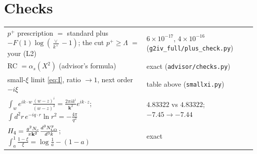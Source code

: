 \documentclass[10pt]{article}
\numberwithin{equation}{section}
\begin{document}
\section{Checks}
\begin{center}\small
\begin{tabular}{@{}p{}p{}@{}}\toprule
$p^+$ prescription $=$ standard plus $-F(1)\log(\frac{\vee}{k^+}-1)$; the cut $p^+\ge\Lambda$ $=$ your (L2) & $6\times10^{-17}$, $4\times10^{-16}$ (\texttt{g2iv\_full/plus\_check.py})\\
RC $=\alpha_s(X^2)$ (advisor's formula) & exact (\texttt{advisor/checks.py})\\
small-$\xi$ limit \eqref{eq:I}, ratio $\to1$, next order $-i\xi$ & table above (\texttt{smallxi.py})\\
$\int_w e^{ik\cdot w}\frac{(w-z)^i}{(w-z)^2}=\frac{2\pi ik^i}{\mathbf k^2}e^{ik\cdot z}$; $\int d^2r\,e^{-iq\cdot r}\ln r^2=-\frac{4\pi}{q^2}$ & $4.83322$ vs $4.83322$; $-7.45\to-7.44$\\
$H_4=\frac{g^2N_c}{\pi\mathbf k^2}\frac{d^3N^y_{\rm LO}}{d^3k}$; $\int_a^1\frac{1-\xi}{\xi}=\log\frac1a-(1-a)$ & exact\\\bottomrule
\end{tabular}
\end{center}
\end{document}
